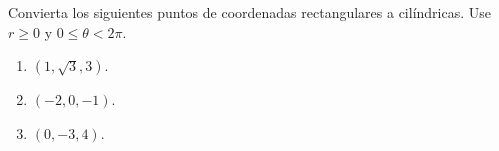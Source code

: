 Convierta los siguientes puntos de coordenadas rectangulares a cilíndricas. Use $r\geq 0$ y $0\leq\theta<2\pi$.
\begin{enumerate}
    \item $(1,\sqrt{3},3)$.
    \item $(-2,0,-1)$.
    \item $(0,-3,4)$.
\end{enumerate}
